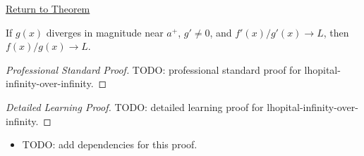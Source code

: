 \newpage
{}
\label{prf:lhopital-infinity-over-infinity}

\begin{remark*}[Return]
\hyperref[thm:lhopital-infinity-over-infinity]{Return to Theorem}
\end{remark*}

\begin{theorem*}
If \(g(x)\) diverges in magnitude near \(a^+\), \(g'\neq 0\), and \(f'(x)/g'(x)\to L\), then \(f(x)/g(x)\to L\).
\end{theorem*}

\begin{proof}[Professional Standard Proof]
\LRAProofBodyStart
TODO: professional standard proof for lhopital-infinity-over-infinity.
\end{proof}

\begin{proof}[Detailed Learning Proof]
\LRAProofBodyStart
TODO: detailed learning proof for lhopital-infinity-over-infinity.
\end{proof}

\begin{remark*}
\end{remark*}

\begin{dependencies}
\begin{itemize}
  \item TODO: add dependencies for this proof.
\end{itemize}
\end{dependencies}

\clearpage
